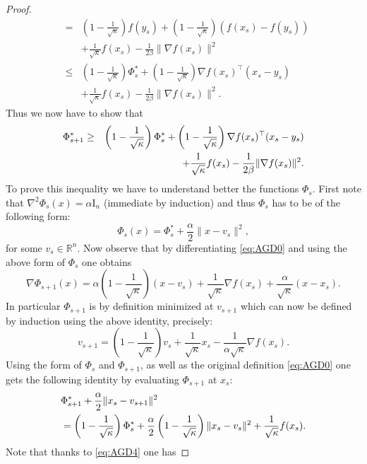 \begin{proof}
\begin{eqnarray*}
& = & \left(1 - \frac{1}{\sqrt{\kappa}}\right) f(y_s) + \left(1 - \frac{1}{\sqrt{\kappa}}\right)(f(x_s) - f(y_s)) \\
& & + \frac{1}{\sqrt{\kappa}} f(x_s) - \frac{1}{2 \beta} \| \nabla f(x_s) \|^2 \\
& \leq & \left(1 - \frac{1}{\sqrt{\kappa}}\right) \Phi_s^* + \left(1 - \frac{1}{\sqrt{\kappa}}\right) \nabla f(x_s)^{\top} (x_s - y_s) \\
& & + \frac{1}{\sqrt{\kappa}} f(x_s) - \frac{1}{2 \beta} \| \nabla f(x_s) \|^2 .
\end{eqnarray*}
Thus we now have to show that
\begin{eqnarray} 
\Phi_{s+1}^* & \geq & \left(1 - \frac{1}{\sqrt{\kappa}}\right) \Phi_s^* + \left(1 - \frac{1}{\sqrt{\kappa}}\right) \nabla f(x_s)^{\top} (x_s - y_s) \notag \\
& & + \frac{1}{\sqrt{\kappa}} f(x_s) - \frac{1}{2 \beta} \| \nabla f(x_s) \|^2 . \label{eq:AGD3}
\end{eqnarray}
To prove this inequality we have to understand better the functions $\Phi_s$. First note that $\nabla^2 \Phi_s(x) = \alpha \mathrm{I}_n$ (immediate by induction) and thus $\Phi_s$ has to be of the following form:
$$\Phi_s(x) = \Phi_s^* + \frac{\alpha}{2} \|x - v_s\|^2 ,$$
for some $v_s \in \mathbb{R}^n$. Now observe that by differentiating \eqref{eq:AGD0} and using the above form of $\Phi_s$ one obtains
$$\nabla \Phi_{s+1}(x) = \alpha \left(1 - \frac{1}{\sqrt{\kappa}}\right) (x-v_s) + \frac{1}{\sqrt{\kappa}} \nabla f(x_s) + \frac{\alpha}{\sqrt{\kappa}} (x-x_s) .$$
In particular $\Phi_{s+1}$ is by definition minimized at $v_{s+1}$ which can now be defined by induction using the above identity, precisely:
\begin{equation} \label{eq:AGD4}
v_{s+1} = \left(1 - \frac{1}{\sqrt{\kappa}}\right) v_s + \frac{1}{\sqrt{\kappa}} x_s - \frac{1}{\alpha \sqrt{\kappa}} \nabla f(x_s) .
\end{equation}
Using the form of $\Phi_s$ and $\Phi_{s+1}$, as well as the original definition \eqref{eq:AGD0} one gets the following identity by evaluating $\Phi_{s+1}$ at $x_s$:
\begin{align} 
& \Phi_{s+1}^* + \frac{\alpha}{2} \|x_s - v_{s+1}\|^2 \notag \\
& = \left(1 - \frac{1}{\sqrt{\kappa}}\right) \Phi_s^* + \frac{\alpha}{2} \left(1 - \frac{1}{\sqrt{\kappa}}\right) \|x_s - v_s\|^2 + \frac{1}{\sqrt{\kappa}} f(x_s) . \label{eq:AGD5}
\end{align}
Note that thanks to \eqref{eq:AGD4} one has

\end{proof}
